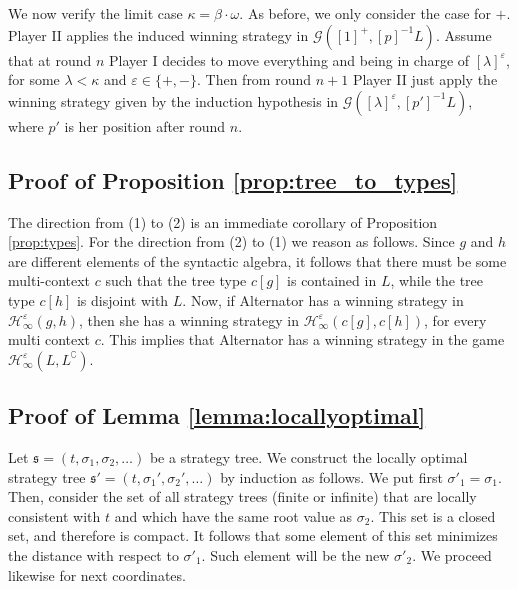We now verify the limit case $\kappa= \beta\cdot\omega$. As before, we only consider the case for $+$. Player II applies the induced winning strategy in $\mathcal{G}([1]^+, [p]^{-1}L)$. Assume that at round $n$ Player I decides to move everything and being in charge of $[\lambda]^\varepsilon$, for some $\lambda < \kappa$ and $\varepsilon\in \{+,-\}$. Then from round $n+1$ Player II just apply the winning strategy given by the induction hypothesis in $\mathcal{G}([\lambda]^\varepsilon, [p']^{-1}L)$, where $p'$ is her position after round $n$. %

\subsection*{Proof of Proposition \ref{prop:tree_to_types}}

The direction from (1) to (2) is an immediate corollary of Proposition \ref{prop:types}.
For the direction from (2) to (1) we reason as follows. Since $g$ and $h$ are different elements of the syntactic algebra, it follows that there must be some multi-context $c$ such that the tree type $c[g]$ is contained in $L$, while the tree type $c[h]$ is disjoint with $L$. 
Now, if Alternator has a winning strategy in $\mathcal{H}^\varepsilon_\infty(g, h)$, then she has a winning strategy in $\mathcal{H}^\varepsilon_\infty(c[g], c[h])$, for every multi context $c$. 
This implies that Alternator has a winning strategy in the game $\mathcal{H}^\varepsilon_\infty(L, L^\complement)$.

\subsection*{Proof of Lemma \ref{lemma:locallyoptimal}}
Let $\mathfrak{s}=(t, \sigma_1, \sigma_2, \dots)$ be a strategy tree. We construct the locally optimal strategy tree $\mathfrak{s}'=(t, \sigma_1', \sigma_2', \dots)$ by induction as follows. We put first $\sigma'_1=\sigma_1$. Then, consider the set of all strategy trees (finite or infinite) that are locally consistent with $t$ and which have the same root value as $\sigma_2$. This set is a closed set, and therefore is compact. It follows that some element of this set minimizes the distance with respect to $\sigma'_1$. Such element will be the new $\sigma'_2$. We proceed likewise for next coordinates. 


